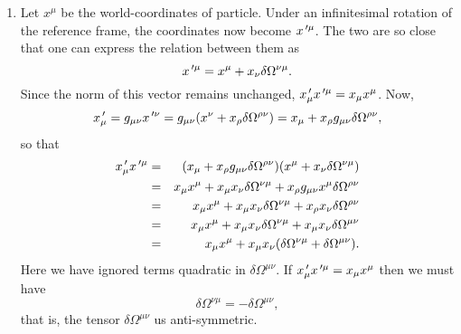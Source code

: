 \begin{enumerate}
\item Let $x^\mu$ be the world-coordinates of particle. Under an infinitesimal 
rotation of the reference frame, the coordinates now become $x^{{\,\prime}\mu}$. The two
are so close that one can express the relation between them as
\begin{equation}\label{c2e78}
x^{{\,\prime}\mu} = x^\mu + x_\nu\delta\Omega^{\nu\mu}.
\end{equation}
Since the norm of this vector remains unchanged, $x^{\,\prime}_\mu x^{{\,\prime}\mu} = x_\mu 
x^\mu$. Now,
\[
x^{\,\prime}_\mu = g_{\mu\nu}x^{{\,\prime}\nu} = g_{\mu\nu}(x^\nu + x_\rho \delta\Omega^{\rho\nu})
= x_\mu + x_\rho g_{\mu\nu}\delta\Omega^{\rho\nu},
\]
so that
\begin{eqnarray*}
x^{\,\prime}_\mu x^{{\,\prime}\mu} &=& (x_\mu + x_\rho g_{\mu\nu}\delta\Omega^{\rho\nu})(x^\mu + 
x_\nu\delta\Omega^{\nu\mu}) \\
 &=& x_\mu x^\mu + x_\mu x_\nu \delta\Omega^{\nu\mu} + x_\rho g_{\mu\nu}x^\mu 
 \delta\Omega^{\rho\nu} \\
 &=& x_\mu x^\mu + x_\mu x_\nu \delta\Omega^{\nu\mu} + x_\rho x_\nu\delta
 \Omega^{\rho\nu} \\
 &=& x_\mu x^\mu + x_\mu x_\nu \delta\Omega^{\nu\mu} + x_\mu x_\nu\delta
 \Omega^{\mu\nu} \\
 &=& x_\mu x^\mu + x_\mu x_\nu (\delta\Omega^{\nu\mu} + \delta \Omega^{\mu\nu}).
\end{eqnarray*}
Here we have ignored terms quadratic in $\delta\Omega^{\mu\nu}$.
If $x^{\,\prime}_\mu x^{{\,\prime}\mu} = x_\mu x^\mu$ then we must have
\begin{equation}\label{c2e79}
\delta\Omega^{\nu\mu} = -\delta \Omega^{\mu\nu},
\end{equation}
that is, the tensor $\delta\Omega^{\mu\nu}$ us anti-symmetric.


\end{enumerate}
